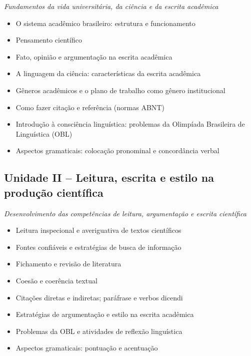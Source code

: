 \documentclass[
]{book}
\providecommand{\tightlist}{%
  \setlength{\itemsep}{0pt}\setlength{\parskip}{0pt}}
\begin{document}
\emph{Fundamentos da vida universitária, da ciência e da escrita acadêmica}

\begin{itemize}
\tightlist
\item
  O sistema acadêmico brasileiro: estrutura e funcionamento\\
\item
  Pensamento científico\\
\item
  Fato, opinião e argumentação na escrita acadêmica\\
\item
  A linguagem da ciência: características da escrita acadêmica\\
\item
  Gêneros acadêmicos e o plano de trabalho como gênero institucional\\
\item
  Como fazer citação e referência (normas ABNT)\\
\item
  Introdução à consciência linguística: problemas da Olimpíada Brasileira de Linguística (OBL)\\
\item
  Aspectos gramaticais: colocação pronominal e concordância verbal
\end{itemize}

\subsection{Unidade II -- Leitura, escrita e estilo na produção científica}\label{unidade-ii-leitura-escrita-e-estilo-na-produuxe7uxe3o-cientuxedfica}

\emph{Desenvolvimento das competências de leitura, argumentação e escrita científica}

\begin{itemize}
\tightlist
\item
  Leitura inspecional e averiguativa de textos científicos\\
\item
  Fontes confiáveis e estratégias de busca de informação\\
\item
  Fichamento e revisão de literatura\\
\item
  Coesão e coerência textual\\
\item
  Citações diretas e indiretas; paráfrase e verbos dicendi\\
\item
  Estratégias de argumentação e estilo na escrita acadêmica\\
\item
  Problemas da OBL e atividades de reflexão linguística\\
\item
  Aspectos gramaticais: pontuação e acentuação
\end{itemize}
\end{document}
